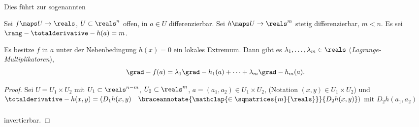 Dies führt zur sogenannten 
\begin{satz}
  Sei \( f\maps U\to \reals \), \( U\subset \reals^n \) offen, in \( a\in U \) differenzierbar. Sei \( h\maps U\to \reals^m \) stetig differenzierbar, \( m<n \). Es sei \( \rang-{\totalderivative-{h}(a)}=m \).

  Es besitze \( f \) in \( a \) unter der Nebenbedingung \( h(x)=0 \) ein lokales Extremum. Dann gibt es \( \lambda_1,\dotsc,\lambda_m\in \reals \) (\emph{Lagrange-Multiplikatoren}), \sd 
  \begin{equation*}
    \grad-{f(a)}=\lambda_1 \grad-{h_1(a)}+\dotsb+\lambda_m \grad-{h_m(a)}.
  \end{equation*}
\end{satz}
\begin{proof}
  Sei \obda \( U=U_1\times U_2 \) mit \( U_1\subset \reals^{n-m} \), \( U_2\subset \reals^m \), \( a=(a_1,a_2)\in U_1\times U_2 \), (Notation \( (x,y)\in U_1\times U_2 \)) und \( \totalderivative-{h}(x,y)=(D_1h(x,y) \quad  \braceannotate{\mathclap{\in \sqmatrices{m}{\reals}}}{D_2 h(x,y)})\vphantom{\underbrace{D_2 h(x,y)}_{\in \sqmatrices{m}{\reals}}} \) mit \( D_2h(a_1,a_2) \) invertierbar.
    

\end{proof}
